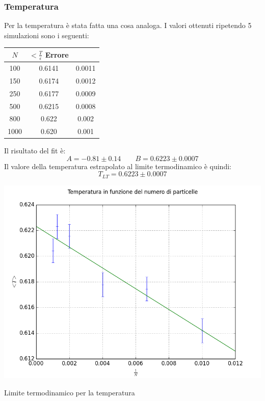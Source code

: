 \subsubsection{Temperatura}
Per la temperatura è stata fatta una cosa analoga. I valori ottenuti ripetendo 5 simulazioni sono i seguenti:
\begin{center}
	\begin{tabular}{c c c }
		\toprule	
		$N$ & $<\frac{T}{\epsilon} $ Errore \\
		\midrule
		100 &  0.6141  & 0.0011 	\\
		150 &  0.6174  & 0.0012 	\\
		250 &  0.6177  & 0.0009 	\\
		500 &  0.6215  & 0.0008 	\\
		800 &  0.622  & 0.002 	\\
		1000 &  0.620  & 0.001 	\\
		\bottomrule
	\end{tabular}
\end{center}

Il risultato del fit è:
$$
	A = -0.81 \pm 0.14 \qquad B = 0.6223 \pm 0.0007
$$
Il valore della temperatura estrapolato al limite termodinamico è quindi:
$$
	T_{LT} = 0.6223 \pm 0.0007
$$
\begin{myfig}[h]
\includegraphics[scale=0.5]{soft_core/12lt_temp.png}
\caption{Limite termodinamico per la temperatura}
\end{myfig}








